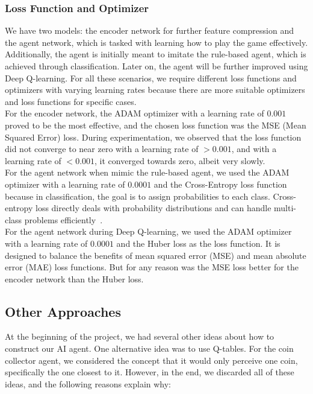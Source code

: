 \subsubsection{Loss Function and Optimizer}

We have two models: the encoder network for further feature compression and the agent network, which is tasked with 
learning how to play the game effectively. Additionally, the agent is initially meant to imitate the rule-based agent, which is 
achieved through classification. Later on, the agent will be further improved using Deep Q-learning. For all these scenarios, we require 
different loss functions and optimizers with varying learning rates because there are more suitable optimizers and loss functions for specific cases.\\

For the encoder network, the ADAM optimizer with a learning rate of $0.001$ proved to be the most effective, and the chosen loss 
function was the MSE (Mean Squared Error) loss. During experimentation, we observed that the loss function did not converge to near 
zero with a learning rate of $>0.001$, and with a learning rate of $<0.001$, it converged towards zero, albeit very slowly. \\

For the agent network when mimic the rule-based agent, we used the ADAM optimizer with a learning rate of $0.0001$ and the Cross-Entropy loss function because
in classification, the goal is to assign probabilities to each class. Cross-entropy loss directly deals with probability 
distributions and can handle multi-class problems efficiently~\cite{Onl:crossentr}.\\

For the agent network during Deep Q-learning, we used the ADAM optimizer with a learning rate of $0.0001$ and the Huber loss as the loss function.
It is designed to balance the benefits of mean squared error (MSE) and mean absolute error (MAE) loss functions.
But for any reason was the MSE loss better for the encoder network than the Huber loss.

\subsection{Other Approaches}

At the beginning of the project, we had several other ideas about how to construct our AI agent. One alternative idea was to use Q-tables. 
For the coin collector agent, we considered the concept that it would only perceive one coin, specifically the one closest to it.
However, in the end, we discarded all of these ideas, and the following reasons explain why:

